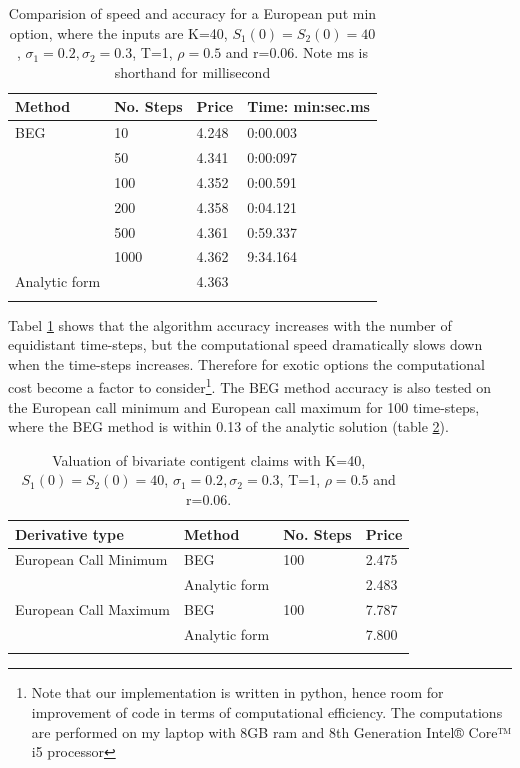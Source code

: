 \begin{table}[th]
\caption{Comparision of speed and accuracy for a European put min option, where the inputs are K=40, $S_1(0)=S_2(0)=40$, $\sigma_1=0.2, \sigma_2=0.3$, T=1, $\rho=0.5$  and r=0.06. Note ms is shorthand for millisecond}
\label{tab:TradeOffEuroMin}
\centering
\begin{tabular}{l l l l}
\toprule
\textbf{Method} & \textbf{No. Steps} & \textbf{Price} & \textbf{Time: min:sec.ms} \\
\midrule
BEG & 10 & 4.248 & 0:00.003\\
& 50 & 4.341 & 0:00:097\\
& 100 & 4.352 & 0:00.591\\
& 200 & 4.358 & 0:04.121\\
& 500 & 4.361 & 0:59.337\\
& 1000 & 4.362 & 9:34.164\\
Analytic form & & 4.363 & \\
\bottomrule\\
\end{tabular}
\end{table}
Tabel \ref{tab:TradeOffEuroMin} shows that the algorithm accuracy increases with the number of equidistant time-steps, but the computational speed dramatically slows down when the time-steps increases. Therefore for exotic options the computational cost become a factor to consider\footnote{Note that our implementation is written in python, hence room for improvement of code in terms of computational efficiency. The computations are performed on my laptop with 8GB ram and 8th Generation Intel® Core™ i5 processor}. The BEG method accuracy is also tested on the European call minimum and European call maximum for 100 time-steps, where the BEG method is within 0.13 of the analytic solution (table \ref{tab:PriceEuropean}).\\
\begin{table}[th]
\caption{Valuation of bivariate contigent claims with K=40, $S_1(0)=S_2(0)=40$, $\sigma_1=0.2, \sigma_2=0.3$, T=1, $\rho=0.5$  and r=0.06.}
\label{tab:PriceEuropean}
\centering
\begin{tabular}{l l l l}
\toprule
\textbf{Derivative type} & \textbf{Method} & \textbf{No. Steps} & \textbf{Price} \\
\midrule
European Call Minimum & BEG & 100 & 2.475\\
& Analytic form & & 2.483\\
European Call Maximum & BEG & 100 & 7.787\\
& Analytic form & & 7.800\\
\bottomrule\\
\end{tabular}
\end{table}
 
